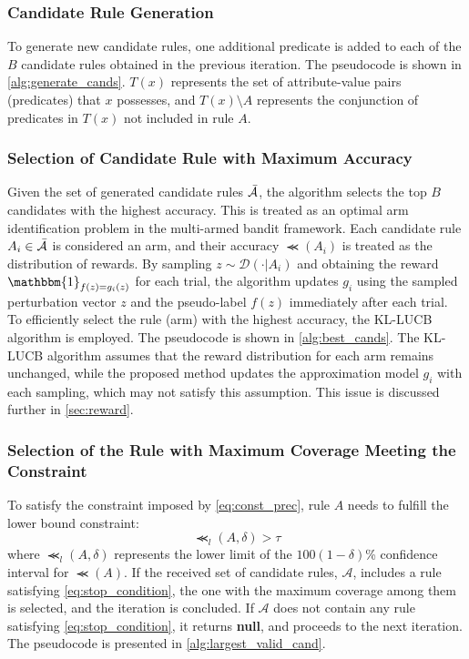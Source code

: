 \documentclass[runningheads]{llncs}
\begin{document}
\subsubsection{Candidate Rule Generation}
To generate new candidate rules, one additional predicate is added to each of the $B$ candidate rules obtained in the previous iteration. The pseudocode is shown in \cref{alg:generate_cands}. $T(x)$ represents the set of attribute-value pairs (predicates) that $x$ possesses, and $T(x)\setminus A$ represents the conjunction of predicates in $T(x)$ not included in rule $A$.

\subsubsection{Selection of Candidate Rule with Maximum Accuracy}
Given the set of generated candidate rules $\bar{\mathcal{A}}$, the algorithm selects the top $B$ candidates with the highest accuracy. This is treated as an optimal arm identification problem in the multi-armed bandit framework. Each candidate rule $A_i\in\bar{\mathcal{A}}$ is considered an arm, and their accuracy $\Prec(A_i)$ is treated as the distribution of rewards. By sampling $z\sim\mathcal{D}(\cdot|A_i)$ and obtaining the reward $\mathbbm{1}_{f(z)=g_i(z)}$ for each trial, the algorithm updates $g_i$ using the sampled perturbation vector $z$ and the pseudo-label $f(z)$ immediately after each trial. To efficiently select the rule (arm) with the highest accuracy, the KL-LUCB algorithm \cite{kaufmann2013information} is employed. The pseudocode is shown in \cref{alg:best_cands}. The KL-LUCB algorithm assumes that the reward distribution for each arm remains unchanged, while the proposed method updates the approximation model $g_i$ with each sampling, which may not satisfy this assumption. This issue is discussed further in \cref{sec:reward}.

\subsubsection{Selection of the Rule with Maximum Coverage Meeting the Constraint}
To satisfy the constraint imposed by \cref{eq:const_prec}, rule $A$ needs to fulfill the lower bound constraint:
\begin{equation}
  \Prec_{l}(A,\delta)>\tau
  \label{eq:stop_condition}
\end{equation}
where $\Prec_{l}(A,\delta)$ represents the lower limit of the $100(1-\delta)$\% confidence interval for $\Prec(A)$.
If the received set of candidate rules, $\mathcal{A}$, includes a rule satisfying \cref{eq:stop_condition},
the one with the maximum coverage among them is selected, and the iteration is concluded.
If $\mathcal{A}$ does not contain any rule satisfying \cref{eq:stop_condition}, it returns \textbf{null},
and proceeds to the next iteration.
The pseudocode is presented in \cref{alg:largest_valid_cand}.
\end{document}
